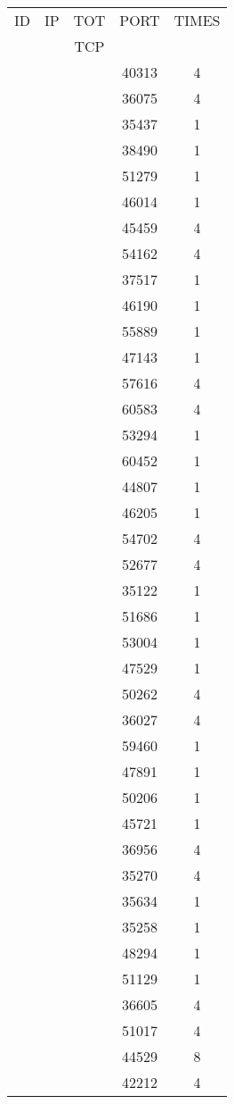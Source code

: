 \documentclass[a4paper]{scrartcl}
\begin{document}
\begin{minipage}[b]{0.5\linewidth}
\begin{tabular}{| c | c | c | c | c |}
\hline
ID & IP & TOT & PORT & TIMES \\ 
   &    & TCP &      &       \\ 
\hline
& & & 40313 & 4 \\ & & & 36075 & 4 \\ & & & 35437 & 1 \\ & & & 38490 & 1 \\ & & & 51279 & 1 \\ & & & 46014 & 1 \\ & & & 45459 & 4 \\ & & & 54162 & 4 \\ & & & 37517 & 1 \\ & & & 46190 & 1 \\ & & & 55889 & 1 \\ & & & 47143 & 1 \\ & & & 57616 & 4 \\ & & & 60583 & 4 \\ & & & 53294 & 1 \\ & & & 60452 & 1 \\ & & & 44807 & 1 \\ & & & 46205 & 1 \\ & & & 54702 & 4 \\ & & & 52677 & 4 \\ & & & 35122 & 1 \\ & & & 51686 & 1 \\ & & & 53004 & 1 \\ & & & 47529 & 1 \\ & & & 50262 & 4 \\ & & & 36027 & 4 \\ & & & 59460 & 1 \\ & & & 47891 & 1 \\ & & & 50206 & 1 \\ & & & 45721 & 1 \\ & & & 36956 & 4 \\ & & & 35270 & 4 \\ & & & 35634 & 1 \\ & & & 35258 & 1 \\ & & & 48294 & 1 \\ & & & 51129 & 1 \\ & & & 36605 & 4 \\ & & & 51017 & 4 \\ & & & 44529 & 8 \\ & & & 42212 & 4 \\ \hline\end{tabular}\end{minipage} \hfill\begin{minipage}[b]{0.5\linewidth}\begin{tabular}{| c | c | c | c | c |}

\end{tabular}
\end{minipage}
\end{document}
